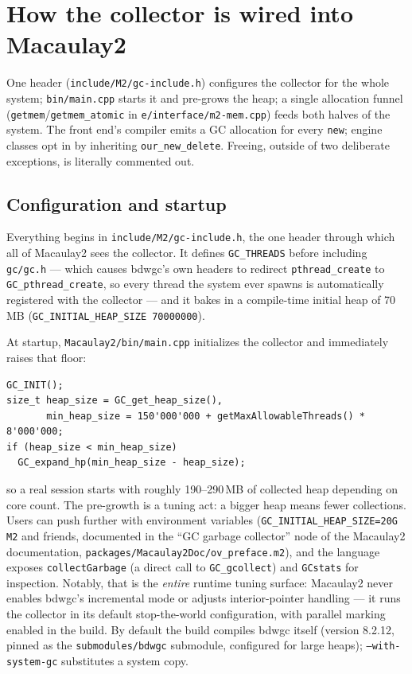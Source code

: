 \documentclass[11pt,oneside]{report}
\newcommand{\code}[1]{\textcolor{m2code}{\texttt{#1}}}
\newcommand{\file}[1]{\textcolor{m2file}{\texttt{#1}}}
\begin{document}
\section{How the collector is wired into Macaulay2}
\label{sec:wiring}

\begin{inbrief}
One header (\file{include/M2/gc-include.h}) configures the collector for the
whole system; \file{bin/main.cpp} starts it and pre-grows the heap; a single
allocation funnel (\code{getmem}/\code{getmem\_atomic} in
\file{e/interface/m2-mem.cpp}) feeds both halves of the system. The front
end's compiler emits a GC allocation for every \code{new}; engine classes opt
in by inheriting \code{our\_new\_delete}. Freeing, outside of two deliberate
exceptions, is literally commented out.
\end{inbrief}

\subsection{Configuration and startup}

Everything begins in \file{include/M2/gc-include.h}, the one header through
which all of Macaulay2 sees the collector. It defines \code{GC\_THREADS}
before including \file{gc/gc.h} --- which causes bdwgc's own headers to
redirect \code{pthread\_create} to \code{GC\_pthread\_create}, so every thread
the system ever spawns is automatically registered with the collector --- and
it bakes in a compile-time initial heap of 70\,MB
(\code{GC\_INITIAL\_HEAP\_SIZE 70000000}).

At startup, \file{Macaulay2/bin/main.cpp} initializes the collector and
immediately raises that floor:

\begin{lstlisting}
GC_INIT();
size_t heap_size = GC_get_heap_size(),
       min_heap_size = 150'000'000 + getMaxAllowableThreads() * 8'000'000;
if (heap_size < min_heap_size)
  GC_expand_hp(min_heap_size - heap_size);
\end{lstlisting}

\noindent so a real session starts with roughly 190--290\,MB of collected
heap depending on core count. The pre-growth is a tuning act: a bigger heap
means fewer collections. Users can push further with environment variables
(\code{GC\_INITIAL\_HEAP\_SIZE=20G M2} and friends, documented in the
``GC garbage collector'' node of the Macaulay2 documentation,
\file{packages/Macaulay2Doc/ov\_preface.m2}), and the language exposes
\code{collectGarbage} (a direct call to \code{GC\_gcollect}) and
\code{GCstats} for inspection. Notably, that is the \emph{entire} runtime
tuning surface: Macaulay2 never enables bdwgc's incremental mode or adjusts
interior-pointer handling --- it runs the collector in its default
stop-the-world configuration, with parallel marking enabled in the build.
By default the build compiles bdwgc itself (version 8.2.12, pinned as the
\file{submodules/bdwgc} submodule, configured for large heaps);
\code{--with-system-gc} substitutes a system copy.
\end{document}
